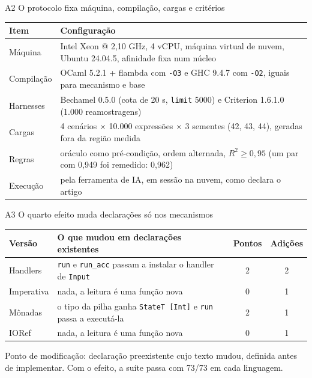 \documentclass[aspectratio=169,10pt]{beamer}
\newcommand{\oc}[1]{\textcolor{ocamlc}{#1}}
\newcommand{\hs}[1]{\textcolor{haskellc}{#1}}
\begin{document}
\begin{frame}{A2 \textperiodcentered{} O protocolo fixa máquina, compilação, cargas e critérios}
  \vspace{4pt}
  \begin{center}
  \small
  \renewcommand{\arraystretch}{1.25}
  \begin{tabular}{lL{11.2cm}}
    \toprule
    \textbf{Item} & \textbf{Configuração} \\
    \midrule
    Máquina & Intel Xeon @ 2,10 GHz, 4 vCPU, máquina virtual de nuvem, Ubuntu 24.04.5, afinidade fixa num núcleo \\
    Compilação & OCaml 5.2.1 + flambda com \texttt{-O3} e GHC 9.4.7 com \texttt{-O2}, iguais para mecanismo e base \\
    Harnesses & Bechamel 0.5.0 (cota de 20 s, \texttt{limit} 5000) e Criterion 1.6.1.0 (1.000 reamostragens) \\
    Cargas & 4 cenários $\times$ 10.000 expressões $\times$ 3 sementes (42, 43, 44), geradas fora da região medida \\
    Regras & oráculo como pré-condição, ordem alternada, $R^2 \geq 0{,}95$ (um par com 0,949 foi remedido: 0,962) \\
    Execução & pela ferramenta de IA, em sessão na nuvem, como declara o artigo \\
    \bottomrule
  \end{tabular}
  \end{center}
\end{frame}

\begin{frame}{A3 \textperiodcentered{} O quarto efeito muda declarações só nos mecanismos}
  \vspace{4pt}
  \begin{center}
  \renewcommand{\arraystretch}{1.25}
  \begin{tabular}{lL{8.2cm}cc}
    \toprule
    \textbf{Versão} & \textbf{O que mudou em declarações existentes} & \textbf{Pontos} & \textbf{Adições} \\
    \midrule
    \oc{Handlers} & \texttt{run} e \texttt{run\_acc} passam a instalar o handler de \texttt{Input} & 2 & 2 \\
    Imperativa & nada, a leitura é uma função nova & 0 & 1 \\
    \hs{Mônadas} & o tipo da pilha ganha \texttt{StateT [Int]} e \texttt{run} passa a executá-la & 2 & 1 \\
    IORef & nada, a leitura é uma função nova & 0 & 1 \\
    \bottomrule
  \end{tabular}
  \end{center}
  \vspace{6pt}
  Ponto de modificação: declaração preexistente cujo texto mudou, definida antes de implementar. Com o efeito, a suíte passa com 73/73 em cada linguagem.
\end{frame}
\end{document}

